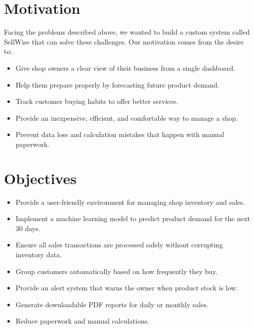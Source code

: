 \documentclass[12pt,a4paper]{report}
\begin{document}
\section{Motivation}
Facing the problems described above, we wanted to build a custom system called SellWise that can solve these challenges. Our motivation comes from the desire to:
\begin{itemize}
    \item Give shop owners a clear view of their business from a single dashboard.
    \item Help them prepare properly by forecasting future product demand.
    \item Track customer buying habits to offer better services.
    \item Provide an inexpensive, efficient, and comfortable way to manage a shop.
    \item Prevent data loss and calculation mistakes that happen with manual paperwork.
\end{itemize}

\section{Objectives}
\begin{itemize}
    \item Provide a user-friendly environment for managing shop inventory and sales.
    \item Implement a machine learning model to predict product demand for the next 30 days.
    \item Ensure all sales transactions are processed safely without corrupting inventory data.
    \item Group customers automatically based on how frequently they buy.
    \item Provide an alert system that warns the owner when product stock is low.
    \item Generate downloadable PDF reports for daily or monthly sales.
    \item Reduce paperwork and manual calculations.
\end{itemize}
\end{document}
